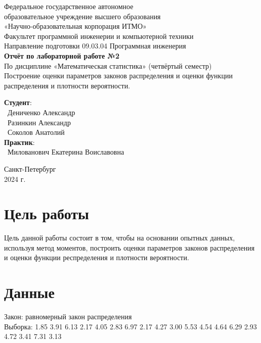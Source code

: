 \documentclass{article}
\begin{document}
\begin{center}
    \Large
    Федеральное государственное автономное \\
    образовательное учреждение высшего образования \\ 
    «Научно-образовательная корпорация ИТМО»\\
    \vspace{0.5cm}
    \large
    Факультет программной инженерии и компьютерной техники \\
    Направление подготовки 09.03.04 Программная инженерия \\
    \vspace{1cm}
    \Large
    \textbf{Отчёт по лабораторной работе №2} \\
    По дисциплине «Математическая статистика» (четвёртый семестр)\\
    Построение оценки параметров законов распределения и оценки функции распределения и плотности вероятности.\\
    \large
    \vspace{8cm}

    \begin{minipage}{.33\textwidth}
    \end{minipage}
    \hfill
    \begin{minipage}{.4\textwidth}
    
        \textbf{Студент}: \vspace{.1cm} \\
        \ Дениченко Александр\\
        \ Разинкин Александр\\
        \ Соколов Анатолий\\
        \textbf{Практик}:  \\
        \ Милованович Екатерина Воиславовна
    \end{minipage}
    \vfill
Санкт-Петербург\\ 2024 г.
\end{center}
\thispagestyle{empty}

\newpage
\section*{Цель работы}
Цель данной работы состоит в том, чтобы на основании опытных данных, используя метод моментов, построить оценки параметров законов распределения и оценки функции респределения и плотности вероятности.
\section*{Данные }
Закон: равномерный закон распределения\\
Выборка: 1.85 3.91 6.13 2.17 4.05 2.83 6.97 2.17 4.27 3.00 5.53 4.54 4.64 6.29 2.93 4.72 3.41 7.31 3.13
\end{document}
